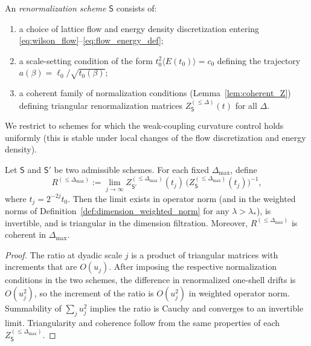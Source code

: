 \begin{definition}
\label{def:admissible_scheme}
An \emph{renormalization scheme} $\mathsf S$ consists of:
\begin{enumerate}[leftmargin=*]
\item a choice of lattice flow and energy density discretization entering \eqref{eq:wilson_flow}--\eqref{eq:flow_energy_def};
\item a scale-setting condition of the form $t_0^2\langle E(t_0)\rangle=c_0$ defining the trajectory $a(\beta)=\ell_0/\sqrt{t_0(\beta)}$;
\item a coherent family of normalization conditions (Lemma~\ref{lem:coherent_Z}) defining triangular renormalization matrices
$Z^{(\le\Delta)}_{\mathsf S}(t)$ for all $\Delta$.
\end{enumerate}
We restrict to schemes for which the weak-coupling curvature control holds uniformly (this is stable under local changes of the flow
discretization and energy density).
\end{definition}

\begin{lemma}
\label{lem:finite_renorm_matrix}
Let $\mathsf S$ and $\mathsf S'$ be two admissible schemes.
For each fixed $\Delta_{\max}$, define
\begin{equation}\label{eq:finite_renorm_def}
 R^{(\le\Delta_{\max})}
 :=\lim_{j\to\infty} Z^{(\le\Delta_{\max})}_{\mathsf S'}(t_j)\,\bigl(Z^{(\le\Delta_{\max})}_{\mathsf S}(t_j)\bigr)^{-1},
\end{equation}
where $t_j=2^{-2j}t_0$.
Then the limit exists in operator norm (and in the weighted norms of Definition~\ref{def:dimension_weighted_norm} for any $\lambda>\lambda_*$),
is invertible, and is triangular in the dimension filtration.
Moreover, $R^{(\le\Delta_{\max})}$ is coherent in $\Delta_{\max}$.
\end{lemma}

\begin{proof}
The ratio at dyadic scale $j$ is a product of triangular matrices with increments that are $O(u_j)$.
After imposing the respective normalization conditions in the two schemes, the difference in renormalized one-shell drifts is $O(u_j^2)$, so the
increment of the ratio is $O(u_j^2)$ in weighted operator norm.
Summability of $\sum_j u_j^2$ implies the ratio is Cauchy and converges to an invertible limit.
Triangularity and coherence follow from the same properties of each $Z^{(\le\Delta_{\max})}_{\mathsf S}$.
\end{proof}

